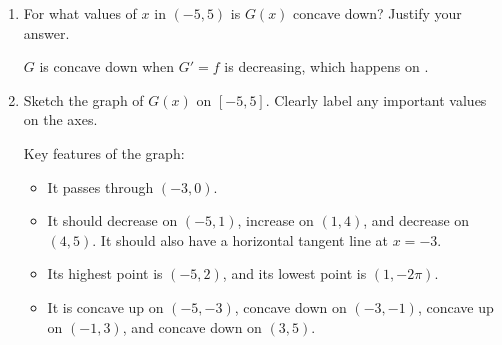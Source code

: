 \documentclass{article}
\begin{document}
\begin{enumerate}
{    \begin{enumerate}[resume]
    \item
      \begin{problem}[\vfill]
        For what values of $x$ in $(-5, 5)$ is $G(x)$ concave down?  Justify 
        your answer.
      \end{problem}

      \begin{solution}
        $G$ is concave down when $G' = f$ is decreasing, which happens on
        .
      \end{solution}

    \item
      \begin{problem}[\stretch{2}]
        Sketch the graph of $G(x)$ on $[-5, 5]$.  Clearly label any
        important values on the axes. 
      \end{problem}

      \begin{solution}
        \begin{center}
        \end{center}
      \end{solution}

      \begin{grading}
        Key features of the graph:
        \begin{itemize}
        \item It passes through $(-3, 0)$.
        \item It should decrease on $(-5, 1)$, increase on $(1, 4)$, and
          decrease on $(4, 5)$.  It should also have a horizontal tangent
          line at $x = -3$.
        \item Its highest point is $(-5, 2)$, and its lowest point is $(1,
          -2\pi)$.
        \item It is concave up on $(-5, -3)$, concave down on $(-3, -1)$,
          concave up on $(-1, 3)$, and concave down on $(3, 5)$. 
        \end{itemize}
      \end{grading}


\end{enumerate}}
\end{enumerate}
\end{document}
